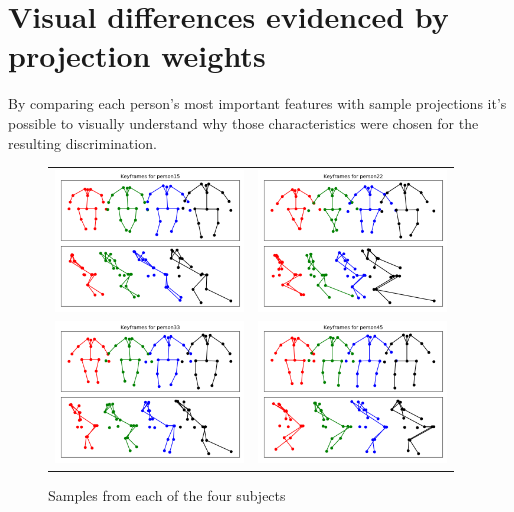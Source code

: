 \documentclass{bmvc2k}
\begin{document}
\section{Visual differences evidenced by projection weights}
By comparing each person's most important features with sample projections it's possible to visually understand why those characteristics were chosen for the resulting discrimination.

\begin{figure}[H]
   \begin{center}
      \begin{tabular}{c c}
         \includegraphics[width=5cm]{figures/walkdata.png}&\includegraphics[width=5cm]{figures/walkdatap2.png}\\
         \includegraphics[width=5cm]{figures/walkdatap3.png}&\includegraphics[width=5cm]{figures/walkdatap4.png}
      \end{tabular}
      \caption{Samples from each of the four subjects}
   \end{center}
\end{figure}
\end{document}
